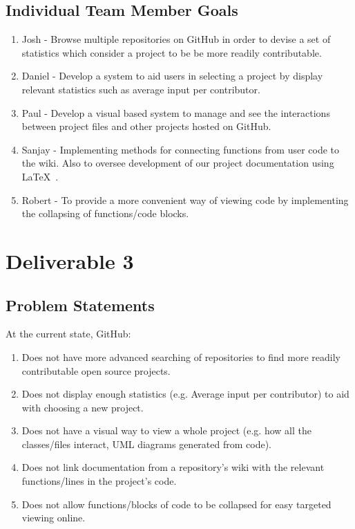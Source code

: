 \documentclass[12pt]{article}
\begin{document}
\subsection{Individual Team Member Goals}
\begin{enumerate}
\item Josh - Browse multiple repositories on \textsf{GitHub} in order to devise a set of statistics which consider a project to be be more readily contributable.
\item Daniel - Develop a system to aid users in selecting a project by display relevant statistics such as average input per contributor.  
\item Paul - Develop a visual based system to manage and see the interactions between project files and other projects hosted on \textsf{GitHub}.
\item Sanjay - Implementing methods for connecting functions from user code to the wiki. Also to oversee development of our project documentation using \LaTeX\ .
\item Robert - To provide a more convenient way of viewing code by implementing the collapsing of functions/code blocks.
\end{enumerate}

\setcounter{section}{3}
\setcounter{subsection}{0}
\section*{Deliverable 3}
\subsection{Problem Statements}
At the current state, \textsf{GitHub}:
\begin{enumerate}
\item  Does not have more advanced searching of repositories to find more readily contributable open source projects.
\item Does not display enough statistics (e.g. Average input per contributor) to aid with choosing a new project.
\item Does not  have a visual way to view a whole project (e.g. how all the classes/files interact, UML diagrams generated from code).
\item Does not link documentation from a repository's wiki with the relevant functions/lines in the project's code.
\item Does not allow functions/blocks of code to be collapsed for easy targeted viewing online.
\end{enumerate}
\end{document}
